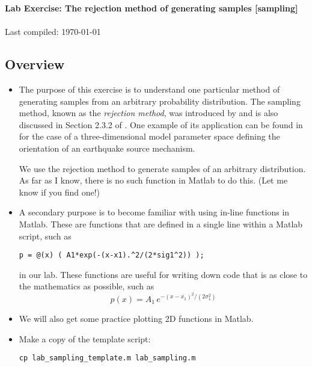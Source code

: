 \documentclass[11pt,titlepage,fleqn]{article}
\begin{document}

\begin{spacing}{1.2}
\centering
{\large \bf Lab Exercise: The rejection method of generating samples [sampling]} \\
\cltag\ \\
Last compiled: \today
\end{spacing}


\subsection*{Overview}

\begin{itemize}
\item The purpose of this exercise is to understand one particular method of generating samples from an arbitrary probability distribution. The sampling method, known as the {\em rejection method}, was introduced by \citet{vonNeumann1951} and is also discussed in Section 2.3.2 of \citet{Tarantola2005}. One example of its application can be found in \citet{SilwalTape2016} for the case of a three-dimensional model parameter space defining the orientation of an earthquake source mechanism.

We use the rejection method to generate samples of an arbitrary distribution. As far as I know, there is no such function in Matlab to do this. (Let me know if you find one!)

\item A secondary purpose is to become familiar with using in-line functions in Matlab. These are functions that are defined in a single line within a Matlab script, such as

\verb+p = @(x) ( A1*exp(-(x-x1).^2/(2*sig1^2)) );+

in our lab. These functions are useful for writing down code that is as close to the mathematics as possible, such as
%
\begin{equation}
p(x) = A_1\,e^{-(x-x_1)^2/(2\sigma_1^2)}
\end{equation}

\item We will also get some practice plotting 2D functions in Matlab.

\item Make a copy of the template script:
%
\begin{verbatim}
cp lab_sampling_template.m lab_sampling.m
\end{verbatim}

\end{itemize}
\end{document}
